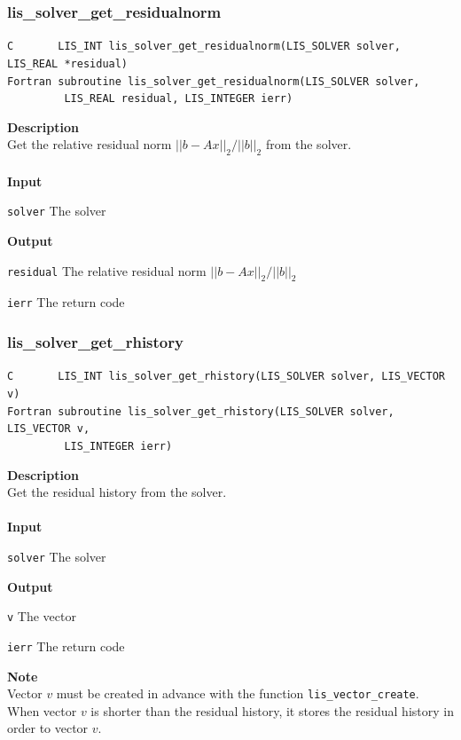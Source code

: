 \documentclass[a4paper]{article}
\newcommand{\namelistlabel}[1]{\mbox{#1}\hfill}
\newenvironment{namelist}[1]{%
\begin{list}{}
  {\let\makelabel\namelistlabel
  \settowidth{\labelwidth}{#1}
  \setlength{\leftmargin}{1.1\labelwidth}}
  }{%
\end{list}}
\begin{document}
\subsubsection{lis\_solver\_get\_residualnorm}
\begin{screen}
\verb|C       LIS_INT lis_solver_get_residualnorm(LIS_SOLVER solver, LIS_REAL *residual)|\\
\verb|Fortran subroutine lis_solver_get_residualnorm(LIS_SOLVER solver,|\\
\verb|         LIS_REAL residual, LIS_INTEGER ierr)|
\end{screen}
{\bf Description}\\
\indent
Get the relative residual norm $||b - Ax||_2 / ||b||_2$ from the solver.
\\ \\
\noindent
{\bf Input}
\begin{namelist}{XXXXXXXXXXXXXXXXXXXX}
\item[\tt solver] The solver
\end{namelist}
{\bf Output}
\begin{namelist}{XXXXXXXXXXXXXXXXXXXX}
\item[\tt residual]  The relative residual norm $||b - Ax||_2 / ||b||_2$
\item[\tt ierr] The return code
\end{namelist}

\newpage
\subsubsection{lis\_solver\_get\_rhistory}
\begin{screen}
\verb|C       LIS_INT lis_solver_get_rhistory(LIS_SOLVER solver, LIS_VECTOR v)|\\
\verb|Fortran subroutine lis_solver_get_rhistory(LIS_SOLVER solver, LIS_VECTOR v,|\\
\verb|         LIS_INTEGER ierr)|
\end{screen}
{\bf Description}\\
\indent
Get the residual history from the solver.
\\ \\
\noindent
{\bf Input}
\begin{namelist}{XXXXXXXXXXXXXXXXXXXX}
\item[\tt solver] The solver
\end{namelist}
{\bf Output}
\begin{namelist}{XXXXXXXXXXXXXXXXXXXX}
\item[\tt v] The vector
\item[\tt ierr] The return code
\end{namelist}
{\bf Note}\\
\indent
Vector $v$ must be created in advance with the function \verb|lis_vector_create|. 
When vector $v$ is shorter than the residual history, 
it stores the residual history in order to vector $v$.
\end{document}
